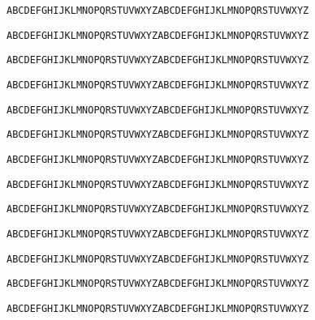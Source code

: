 \vfill          %

{\tt ABCDEFGHIJKLMNOPQRSTUVWXYZABCDEFGHIJKLMNOPQRSTUVWXYZ}

\vspace{0.1in}

{\tt ABCDEFGHIJKLMNOPQRSTUVWXYZABCDEFGHIJKLMNOPQRSTUVWXYZ}

\vspace{0.1in}

{\tt ABCDEFGHIJKLMNOPQRSTUVWXYZABCDEFGHIJKLMNOPQRSTUVWXYZ}

\vspace{0.1in}

{\tt ABCDEFGHIJKLMNOPQRSTUVWXYZABCDEFGHIJKLMNOPQRSTUVWXYZ}

\vspace{0.1in}

{\tt ABCDEFGHIJKLMNOPQRSTUVWXYZABCDEFGHIJKLMNOPQRSTUVWXYZ}

\vspace{0.1in}

{\tt ABCDEFGHIJKLMNOPQRSTUVWXYZABCDEFGHIJKLMNOPQRSTUVWXYZ}

\vspace{0.1in}

{\tt ABCDEFGHIJKLMNOPQRSTUVWXYZABCDEFGHIJKLMNOPQRSTUVWXYZ}

\vspace{0.1in}

{\tt ABCDEFGHIJKLMNOPQRSTUVWXYZABCDEFGHIJKLMNOPQRSTUVWXYZ}

\vspace{0.1in}

{\tt ABCDEFGHIJKLMNOPQRSTUVWXYZABCDEFGHIJKLMNOPQRSTUVWXYZ}

\vspace{0.1in}

{\tt ABCDEFGHIJKLMNOPQRSTUVWXYZABCDEFGHIJKLMNOPQRSTUVWXYZ}

\vspace{0.1in}

{\tt ABCDEFGHIJKLMNOPQRSTUVWXYZABCDEFGHIJKLMNOPQRSTUVWXYZ}

\vspace{0.1in}

{\tt ABCDEFGHIJKLMNOPQRSTUVWXYZABCDEFGHIJKLMNOPQRSTUVWXYZ}

\vspace{0.1in}

{\tt ABCDEFGHIJKLMNOPQRSTUVWXYZABCDEFGHIJKLMNOPQRSTUVWXYZ}

\vspace{0.1in}

